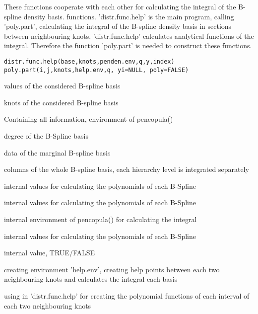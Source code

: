 \documentclass[a4paper]{book}
\begin{document}
%
\begin{Description}\relax
These functions cooperate with each other for calculating the
integral of the B-spline density basis. functions. 'distr.func.help' is the main program, calling
'poly.part', calculating the integral of the B-spline density basis in sections between neighbouring knots. 'distr.func.help' calculates analytical functions of the integral. Therefore the function 'poly.part' is needed to construct these functions.
\end{Description}
%
\begin{Usage}
\begin{verbatim}
distr.func.help(base,knots,penden.env,q,y,index)
poly.part(i,j,knots,help.env,q, yi=NULL, poly=FALSE)
\end{verbatim}
\end{Usage}
%
\begin{Arguments}
\begin{ldescription}
\item[\code{base}] values of the considered B-spline basis
\item[\code{knots}] knots of the considered B-spline basis
\item[\code{penden.env}] Containing all information, environment of pencopula()
\item[\code{q}] degree of the B-Spline basis
\item[\code{y}] data of the marginal B-spline basis
\item[\code{index}] columns of the whole B-spline basis, each hierarchy level
is integrated separately
\item[\code{i}] internal values for calculating the polynomials of each B-Spline
\item[\code{j}] internal values for calculating the polynomials of each
B-Spline
\item[\code{help.env}] internal environment of pencopula() for calculating
the integral
\item[\code{yi}] internal values for calculating the polynomials of each
B-Spline
\item[\code{poly}] internal value, TRUE/FALSE
\end{ldescription}
\end{Arguments}
%
\begin{Value}
\begin{ldescription}
\item[\code{distr.func.help}] creating environment 'help.env', creating help points between each two neighbouring knots and calculates the integral each basis
\item[\code{poly.part}] using in 'distr.func.help' for creating the polynomial functions of each interval of each two neighbouring knots
\end{ldescription}
\end{Value}
\end{document}
